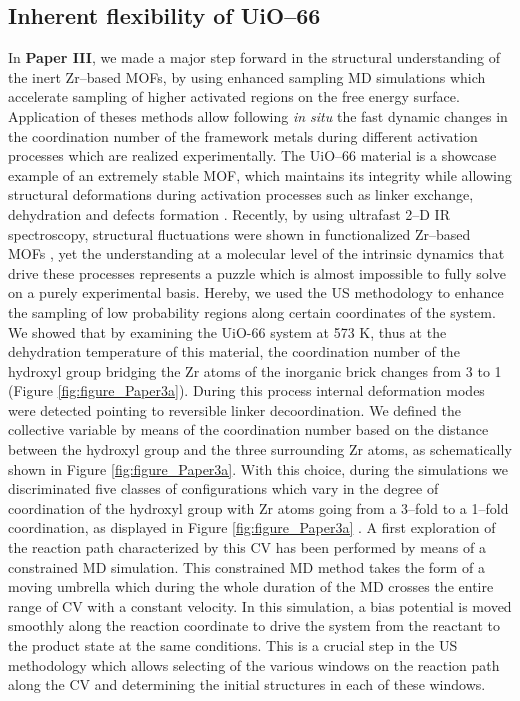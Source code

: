 \subsection*{Inherent flexibility of UiO--66}
In \textbf{Paper III}, we made a major step forward in the structural understanding of the
inert Zr--based MOFs, by using enhanced sampling MD simulations
which accelerate sampling of higher activated regions on the free energy 
surface. Application of theses methods allow following \textit{in situ} the
fast dynamic changes in the coordination number of the framework metals during
different activation processes which are realized experimentally. The UiO--66
material is a showcase example of an extremely stable MOF, 
which maintains its integrity while allowing structural deformations during
activation processes such as linker exchange, dehydration and defects
formation \cite{Kim2012a, Kim2012, Horike2009, Leus2016}. Recently, by using
ultrafast 2--D IR spectroscopy, structural fluctuations were shown in
functionalized Zr--based MOFs \cite{Nishida2014}, yet the understanding at a
molecular level of the intrinsic dynamics that drive these processes represents a puzzle which is almost impossible to fully solve on a purely experimental basis.
Hereby, we used the US methodology to enhance the sampling of low probability
regions along certain coordinates of the system. We showed that by examining the UiO-66 system at 573 K, thus at the
dehydration temperature of this material,
the coordination number of the hydroxyl group bridging the Zr atoms of the
inorganic brick changes from 3 to 1 (Figure \ref{fig:figure_Paper3a}). During
this process internal deformation modes were detected pointing to reversible linker decoordination.
We defined the collective variable by means of the coordination number based on
the distance between the hydroxyl group and the three surrounding Zr atoms, as
schematically shown in Figure \ref{fig:figure_Paper3a}. With this choice, during
the simulations we discriminated five classes of configurations which vary in
the degree of coordination of the hydroxyl group with Zr
atoms going from a 3--fold to a 1--fold coordination, as displayed in Figure
\ref{fig:figure_Paper3a} \cite{Hajek2018}. A first exploration of the reaction
path characterized by this CV has been
performed by means of a constrained MD simulation. This constrained MD method
takes the form of a moving umbrella which during the whole duration of the MD
crosses the entire range of CV with a constant velocity. In this simulation, a bias potential is moved smoothly along the reaction
coordinate to drive the system from the reactant to the product state at the same
conditions. This is a crucial step in the US methodology which allows selecting
of the various windows on the reaction path along the CV and determining the
initial structures in each of these windows.

